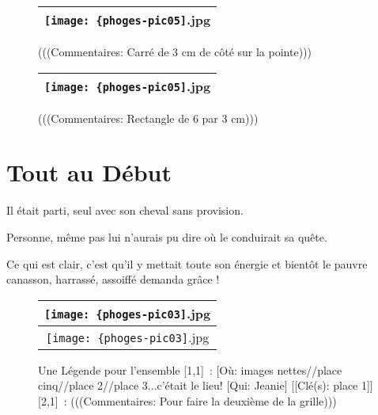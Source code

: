\documentclass[12pt,twocolumn,french]{article}
\begin{document}
  \begin{figure}[H]
    \caption{
      (((Commentaires: Carré de 3 cm de côté sur la pointe)))
    }
    \vspace{4mm}
    \label{phoges-pic05.jpg}
    \noindent \centering{}
    \begin{tabular}{|c|}
      \hline
          \texttt{[image: \{phoges-pic05]}.jpg}
        \tabularnewline \hline
    \end{tabular}
  \end{figure}

  \begin{figure}[H]
    \caption{
      (((Commentaires: Rectangle de 6 par 3 cm)))
    }
    \vspace{4mm}
    \label{phoges-pic05.jpg}
    \noindent \centering{}
    \begin{tabular}{|c|}
      \hline
          \texttt{[image: \{phoges-pic05]}.jpg}
        \tabularnewline \hline
    \end{tabular}
  \end{figure}
%
\section{Tout au Début}
%

Il était parti, seul avec son cheval sans provision.

Personne, même pas lui n'aurais pu dire où le conduirait sa quête.

Ce qui est clair, c'est qu'il y mettait toute son énergie et bientôt le pauvre canasson, harrassé, assoiffé demanda grâce !

  \begin{figure}[H]
    \caption{
      Une Légende pour l'ensemble 
      [1,1]~: 
       [Où: images nettes//place cinq//place 2//place 3...c'était le lieu!
       [Qui: Jeanie] 
      [[Clé(s): place 1]] 
      [2,1]~: 
      (((Commentaires: Pour faire la deuxième de la grille)))
    }
    \vspace{4mm}
    \label{phoges-pic03.jpg}
    \noindent \centering{}
    \begin{tabular}{|c|}
      \hline
          \texttt{[image: \{phoges-pic03]}.jpg}
        \tabularnewline \hline
          \texttt{[image: \{phoges-pic03]}.jpg}
        \tabularnewline \hline
    \end{tabular}
  \end{figure}
\end{document}
